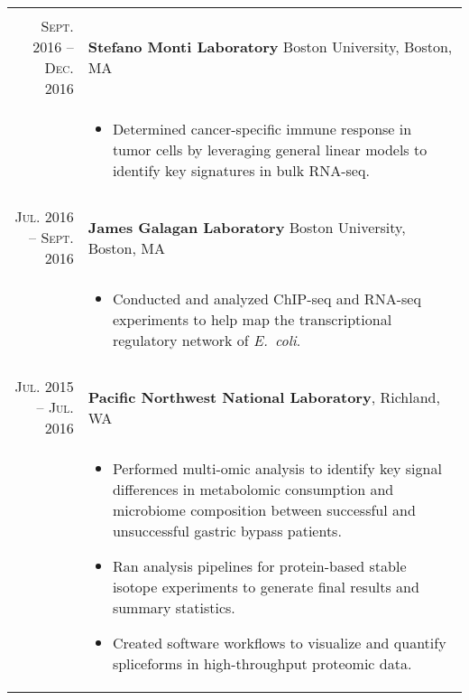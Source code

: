 \documentclass[a4paper,10pt]{report}
\begin{document}
\begin{longtable}{r|p{10cm}}
	\multicolumn{2}{c}{}
	\\[-0.75em]
	\textsc{Sept. 2016 -- Dec. 2016} & \textbf{Stefano Monti Laboratory} Boston University, Boston, MA    \\
	                                 & \footnotesize{
		\vspace{-3.5mm}
		\begin{itemize}
			\setlength\itemsep{0em}
			\item Determined cancer-specific immune response in
			      tumor cells by leveraging general linear models to identify key signatures in bulk RNA-seq.
		\end{itemize}
	} \vspace{-3.5mm}                                                                                     \\
	\multicolumn{2}{c}{}
	\\[-0.75em]
	\textsc{Jul. 2016 -- Sept. 2016} & \textbf{James Galagan Laboratory} Boston University, Boston, MA    \\                                                                  	                                 & \footnotesize{
		\vspace{-3.5mm}
		\begin{itemize}
			\setlength\itemsep{0em}
			\item Conducted and analyzed ChIP-seq and RNA-seq experiments to help map the transcriptional
			      regulatory network of \emph{E.\ coli}.
		\end{itemize}
	} \vspace{-3.5mm}                                                                                     \\
	\multicolumn{2}{c}{}
	\\[-0.75em]
	\textsc{Jul. 2015 -- Jul. 2016}  & \textbf{Pacific Northwest National Laboratory}, Richland, WA       \\
	                                 & \footnotesize{
		\vspace{-3.5mm}
		\begin{itemize}
			\setlength\itemsep{0em}
			\item Performed multi-omic analysis to identify key signal differences in metabolomic consumption and microbiome composition between successful and
			      unsuccessful gastric bypass patients.
			\item Ran analysis pipelines for protein-based stable isotope experiments to generate final results and summary statistics.
			\item Created software workflows to visualize and quantify spliceforms in high-throughput proteomic data.
		\end{itemize}
	} \vspace{-3.5mm}                                                                                     \\
\end{longtable}
\end{document}
